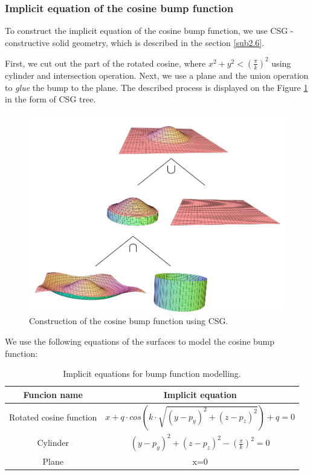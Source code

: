\subsubsection*{Implicit equation of the cosine bump function}
To construct the implicit equation of the cosine bump function, we use CSG
- constructive solid geometry, which is described in the section \ref{sub2.6}.

First, we cut out the part of the rotated cosine, where
$x^2+y^2<(\frac{\pi}{k})^2$ using cylinder and intersection operation. Next,
we use a plane and the union operation to \textit{glue} the bump to the plane.
The described process is displayed on the Figure \ref{img:24} in the form of CSG tree.
\begin{figure}
    \centerline{\includegraphics[scale=0.5]{images/img24}}
    \caption[Construction of the cosine bump function using CSG]
    {Construction of the cosine bump function using CSG.}
    \label{img:24}
\end{figure}
We use the following equations of the surfaces to model the cosine bump function:

\begin{table}[]
    \centering
    \begin{tabular}{|c|c|}
        \hline\hline
    Funcion name            & Implicit equation                                        \\ \hline\hline
    Rotated cosine function & $x+q \cdot cos(k \cdot \sqrt{(y-p_y)^2+(z-p_z)^2})+q=0$  \\ \hline
    Cylinder                & $(y-p_y)^2+(z-p_z)^2-(\frac{\pi}{k})^2=0$                \\ \hline
    Plane                   & x=0                                                      \\ \hline\hline
    \end{tabular}
    \caption[Implicit equations for bump function modelling]
    {Implicit equations for bump function modelling.}
    \label{tab:1}
    \end{table}

